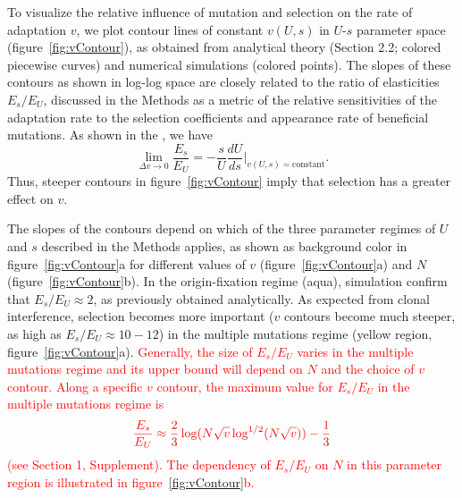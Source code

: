 \documentclass[9pt,twocolumn,twoside]{article}
\begin{document}
To visualize the relative influence of mutation and selection on the rate of adaptation $v$, we plot contour lines of constant $v(U,s)$ in $U$-$s$ parameter space (figure~\ref{fig:vContour}), as obtained from analytical theory (Section 2.2; colored piecewise curves) and numerical simulations (colored points). The slopes of these contours as shown in log-log space are closely related to the ratio of elasticities $E_s/E_U$, discussed in the Methods as a metric of the relative sensitivities of the adaptation rate to the selection coefficients and appearance rate of beneficial mutations. As shown in the , we have 
\begin{equation}
\lim_{\Delta v\rightarrow 0}\frac{E_s}{E_U} = -\frac{s}{U}\frac{d U}{d s}\bigg\rvert_{v(U,s)=\mathrm{constant}}. \label{eq:EsEUslope}
\end{equation}
Thus, steeper contours in figure~\ref{fig:vContour} imply that selection has a greater effect on $v$. 

The slopes of the contours depend on which of the three parameter regimes of $U$ and $s$ described in the Methods applies, as shown as background color in figure~\ref{fig:vContour}a for different values of $v$ (figure~\ref{fig:vContour}a) and $N$ (figure~\ref{fig:vContour}b). In the origin-fixation regime (aqua), simulation confirm that $E_s/E_U \approx 2$, as previously obtained analytically. As expected from clonal interference, selection becomes more important ($v$ contours become much steeper, as high as $E_s/E_U \approx 10-12$) in the multiple mutations regime (yellow region, figure~\ref{fig:vContour}a). \textcolor{red}{Generally, the size of $E_s/E_U$ varies in the multiple mutations regime and its upper bound will depend on $N$ and the choice of $v$ contour. Along a specific $v$ contour, the maximum value for $E_s/E_U$ in the multiple mutations regime is}
\begin{equation}\label{EsEuMultMut}
\textcolor{red}{\frac{E_s}{E_U} \approx \frac{2}{3} \log(N\sqrt{v}\log^{1/2}(N\sqrt{v}))-\frac{1}{3}}
\end{equation}
\textcolor{red}{(see Section 1, Supplement). The dependency of $E_s/E_U$ on $N$ in this parameter region is illustrated in figure~\ref{fig:vContour}b.} 
\end{document}
